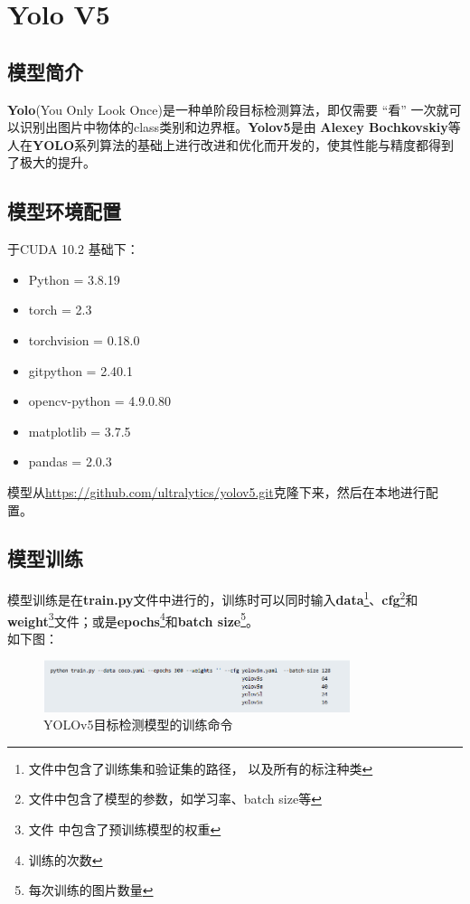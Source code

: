 \documentclass{nwputhesis}
\begin{document}
\section{Yolo V5}
\subsection{模型简介}
\textbf{Yolo}(You Only Look Once)是一种单阶段目标检测算法，即仅需要 “看” 一次就可以识别出图片中物体的class类别和边界框。\textbf{Yolov5}是由
\textbf{Alexey Bochkovskiy}等人在\textbf{YOLO}系列算法的基础上进行改进和优化而开发的，使其性能与精度都得到了极大的提升。
\subsection{模型环境配置}
\noindent 于CUDA 10.2 基础下：
\begin{itemize}
    \item Python = 3.8.19
    \item torch = 2.3
    \item torchvision = 0.18.0
    \item gitpython = 2.40.1
    \item opencv-python = 4.9.0.80
    \item matplotlib = 3.7.5
    \item pandas = 2.0.3
\end{itemize}
模型从\underline{https://github.com/ultralytics/yolov5.git}克隆下来，然后在本地进行配置。

\subsection{模型训练}
\indent 模型训练是在\textbf{train.py}文件中进行的，训练时可以同时输入\textbf{data}\footnote{文件中包含了训练集和验证集的路径，
以及所有的标注种类}、\textbf{cfg}\footnote{文件中包含了模型的参数，如学习率、batch size等}和\textbf{weight}\footnote{文件
中包含了预训练模型的权重}文件；或是\textbf{epochs}\footnote{训练的次数}和\textbf{batch size}\footnote{每次训练的图片数量}。
\\
如下图：
\begin{figure}[H]
    \centering
    \includegraphics[width=0.8\textwidth]{picture/2.png}
    \caption{YOLOv5目标检测模型的训练命令}
\end{figure}
\end{document}
